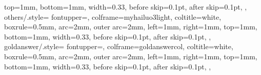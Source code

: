 {{        top=1mm,          %
        bottom=1mm,       %
        width=0.33\textwidth, %
        before skip=0.1pt,
        after skip=0.1pt, 
    },
    others/.style={
        fontupper=\scriptsize,
        colframe=myhailuo3light, 
        coltitle=white,
        boxrule=0.5mm,    %
        arc=2mm,          %
        outer arc=2mm,    %
        left=1mm,         %
        right=1mm,        %
        top=1mm,          %
        bottom=1mm,       %
        width=0.33\textwidth, %
        before skip=0.1pt,
        after skip=0.1pt, 
    },
    goldanswer/.style={
        fontupper=\scriptsize,
        colframe=goldanswercol,     %
        coltitle=white,   %
        boxrule=0.5mm,    %
        arc=2mm,          %
        outer arc=2mm,    %
        left=1mm,         %
        right=1mm,        %
        top=1mm,          %
        bottom=1mm,       %
        width=0.33\textwidth, %
        before skip=0.1pt,
        after skip=0.1pt, 
    },
}
